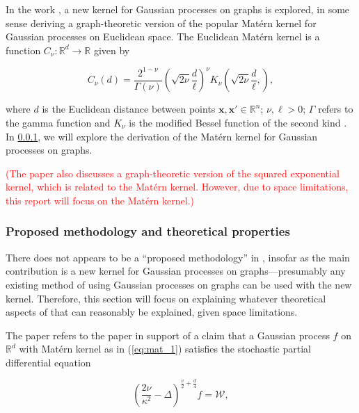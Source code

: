In the work \cite{pmlr-v130-borovitskiy21a}, a new kernel for Gaussian processes on graphs is explored, in some sense deriving a graph-theoretic version of the popular Mat\'{e}rn kernel for Gaussian processes on Euclidean space. The Euclidean Mat\'{e}rn kernel is a function $C_{\nu} \colon \mathbb R^d \to \mathbb R$ given by

\begin{equation}\label{eq:mat_1}
    C_{\nu}(d) = \frac{2^{1 - \nu}}{\Gamma(\nu)} \left(\sqrt{2 \nu} \frac{d}{\ell}\right)^{\nu} K_{\nu}\left(\sqrt{2 \nu} \frac{d}{\ell},\right),
\end{equation}

where $d$ is the Euclidean distance between points $\bm x, \bm x' \in \mathbb R^n$; $\nu, \ell > 0$; $\Gamma$ refers to the gamma function and $K_{\nu}$ is the modified Bessel function of the second kind \cite{rw}. In \ref{sec:method}, we will explore the derivation of the Mat\'{e}rn kernel for Gaussian processes on graphs.

\textcolor{red}{(The paper \cite{pmlr-v130-borovitskiy21a} also discusses a graph-theoretic version of the squared exponential kernel, which is related to the Mat\'{e}rn kernel. However, due to space limitations, this report will focus on the Mat\'{e}rn kernel.)}

\subsubsection{Proposed methodology and theoretical properties}\label{sec:method}

There does not appears to be a ``proposed methodology'' in \cite{pmlr-v130-borovitskiy21a}, insofar as the main contribution is a new kernel for Gaussian processes on graphs---presumably any existing method of using Gaussian processes on graphs can be used with the new kernel. Therefore, this section will focus on explaining whatever theoretical aspects of \cite{pmlr-v130-borovitskiy21a} that can reasonably be explained, given space limitations.

The paper \cite{pmlr-v130-borovitskiy21a} refers to the paper \cite{whittle1963stochastic} in support of a claim that a Gaussian process $f$ on $\mathbb R^d$ with Mat\'{e}rn kernel as in (\ref{eq:mat_1}) satisfies the stochastic partial differential equation

\begin{equation}\label{eq:spde_mat}
    \left(\frac{2\nu}{\kappa^2} - \Delta\right)^{\frac{\nu}{2} + \frac{d}{4}}f = \mathcal W,
\end{equation}

